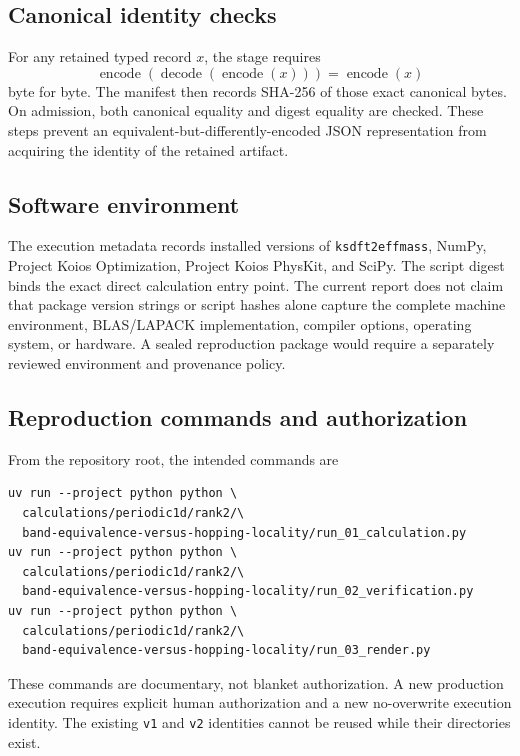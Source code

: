 \subsection{Canonical identity checks}

For any retained typed record $x$, the stage requires
\begin{equation}
 \operatorname{encode}(\operatorname{decode}(\operatorname{encode}(x)))
 =\operatorname{encode}(x)
 \label{eq:canonical-roundtrip}
\end{equation}
byte for byte.  The manifest then records SHA-256 of those exact canonical bytes.  On
admission, both canonical equality and digest equality are checked.  These steps prevent
an equivalent-but-differently-encoded JSON representation from acquiring the identity
of the retained artifact.

\subsection{Software environment}

The execution metadata records installed versions of \texttt{ksdft2effmass}, NumPy,
Project Koios Optimization, Project Koios PhysKit, and SciPy.  The script digest binds the
exact direct calculation entry point.  The current report does not claim that package
version strings or script hashes alone capture the complete machine environment,
BLAS/LAPACK implementation, compiler options, operating system, or hardware.  A sealed
reproduction package would require a separately reviewed environment and provenance
policy.

\subsection{Reproduction commands and authorization}

From the repository root, the intended commands are
\begin{verbatim}
uv run --project python python \
  calculations/periodic1d/rank2/\
  band-equivalence-versus-hopping-locality/run_01_calculation.py
uv run --project python python \
  calculations/periodic1d/rank2/\
  band-equivalence-versus-hopping-locality/run_02_verification.py
uv run --project python python \
  calculations/periodic1d/rank2/\
  band-equivalence-versus-hopping-locality/run_03_render.py
\end{verbatim}
These commands are documentary, not blanket authorization.  A new production execution
requires explicit human authorization and a new no-overwrite execution identity.  The
existing \texttt{v1} and \texttt{v2} identities cannot be reused while their directories
exist.

